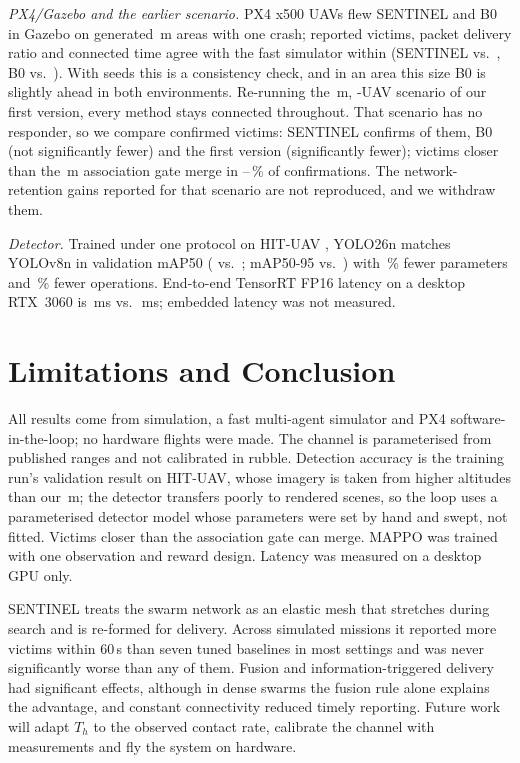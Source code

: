\documentclass[conference]{IEEEtran}
\begin{document}
\emph{PX4/Gazebo and the earlier scenario.}\label{sec:sitl} \nEightN{} PX4 x500 UAVs flew SENTINEL and B0 in
Gazebo on \nEightWorlds{} generated \nEightArea\,m areas with one crash; reported victims, packet delivery ratio and connected time
agree with the fast simulator within \nEightMaxDiff{} (SENTINEL \nEightSitlS{} vs.\ \nEightFastS,
B0 \nEightSitlB{} vs.\ \nEightFastB). With \nEightWorlds{} seeds this is a consistency check, and in an area this
size B0 is slightly ahead in both environments. Re-running the \nNineArea\,m, \nNineN-UAV scenario of our first
version, every method stays connected throughout. That scenario has no responder, so we compare confirmed victims: SENTINEL confirms
\nNineS{} of them, B0 \nNineBzero{} (not significantly fewer) and the first version \nNineBone{}
(significantly fewer); victims closer than the \nGate\,m
association gate merge in \nNineAssocLo--\nNineAssocHi\,\% of confirmations. The network-retention
gains reported for that scenario are not reproduced, and we withdraw them.

\emph{Detector.} Trained under one protocol on HIT-UAV \cite{hituav}, YOLO26n \cite{yolo26} matches
YOLOv8n in validation mAP50 (\nYnMap{} vs.\ \nVeMap; mAP50-95 \nYnMapB{} vs.\ \nVeMapB) with
\nYnParamRed\,\% fewer parameters and \nYnFlopRed\,\% fewer operations. End-to-end TensorRT FP16
latency on a desktop RTX~3060 is \nYnTrt\,ms vs.\ \nVeTrt\,ms; embedded latency was not measured.

\section{Limitations and Conclusion}
All results come from simulation, a fast multi-agent simulator and PX4 software-in-the-loop; no
hardware flights were made. The channel is parameterised from published ranges and not calibrated in
rubble. Detection accuracy is the training run's validation result on HIT-UAV, whose imagery is taken
from higher altitudes than our \nAlt\,m; the detector transfers poorly to rendered scenes, so the loop uses
a parameterised detector model whose parameters were set by hand and swept, not fitted. Victims closer
than the association gate can merge. MAPPO was trained with one observation and reward design. Latency
was measured on a desktop GPU only.

SENTINEL treats the swarm network as an elastic mesh that stretches during search and is re-formed
for delivery. Across \nMissions{} simulated missions it reported more victims within 60\,s than seven
tuned baselines in most settings and was never significantly worse than any of them. Fusion and
information-triggered delivery had significant effects, although in dense swarms the fusion rule
alone explains the advantage, and constant connectivity reduced timely reporting. Future work
will adapt $T_h$ to the observed contact rate, calibrate the channel with measurements and fly the
system on hardware.



\end{document}
